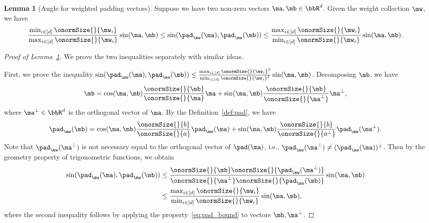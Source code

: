 \documentclass[lettersize,onecolumn,journal]{IEEEtran}
\theoremstyle{definition}
\newtheorem{lem}{Lemma}
\theoremstyle{definition}
\begin{document}
\begin{lem}[Angle for weighted padding vectors]\label{lem:pad} Suppose we have two non-zero vectors $\ma, \mb \in \bbR^d$. Given the weight collection $\mw$, we have 
\begin{equation}
   \frac{\min_{i \in [d]} \onormSize{}{\mw_i}}{\max_{i \in [d]} \onormSize{}{\mw_i} } \sin (\ma, \mb) \leq \sin(\pad_{\mw}(\ma),  \pad_{\mw}(\mb)) \leq \frac{ \max_{i \in [d]} \onormSize{}{\mw_i} }{\min_{i \in [d]} \onormSize{}{\mw_i}} \sin (\ma, \mb).
\end{equation}
\end{lem}

\begin{proof}[Proof of Lemma~\ref{lem:pad}] We prove the two inequalities separately with similar ideas.

First, we prove the inequality $\sin(\pad_{\mw}(\ma),  \pad_{\mw}(\mb)) \leq \frac{ \max_{i \in [d]} \onormSize{}{\mw_i}^2 }{\min_{i \in [d]} \onormSize{}{\mw_i}^2} \sin (\ma, \mb)$. Decomposing $\mb$, we have
\begin{equation}
    \mb = \cos (\ma, \mb) \frac{\onormSize{}{\mb}}{\onormSize{}{\ma}} \ma + \sin (\ma, \mb) \frac{\onormSize{}{\mb}}{\onormSize{}{\ma^{\perp}}}\ma^{\perp},
\end{equation}
where $\ma^{\perp} \in \bbR^d$ is the orthogonal vector of $\ma$. By the Definition~\ref{def:pad}, we have 
\begin{equation}\label{eq:pad_second_ineq}
    \pad_{\mw}(\mb) = \cos (\ma, \mb) \frac{\onormSize{}{b}}{\onormSize{}{a}} \pad_{\mw}(\ma) + \sin (\ma, \mb) \frac{\onormSize{}{b}}{\onormSize{}{a^{\perp}}} \pad_{\mw}(\ma^{\perp}).
\end{equation}
Note that $\pad_{\mw}(\ma^{\perp})$ is not necessary equal to the orthogonal vector of $\pad(\ma)$, i.e., $\pad_{\mw}(\ma^{\perp}) \neq (\pad_{\mw}(\ma))^{\perp}$. Then by the geometry property of trigonometric functions, we obtain
\begin{align}
    \sin(\pad_{\mw}(\ma),  \pad_{\mw}(\mb))  &\leq \frac{  \onormSize{}{\mb} \onormSize{}{\pad_{\mw}(\ma^{\perp})} }{ \onormSize{}{\ma^{\perp}} \onormSize{}{ \pad_{\mw}(\mb)}} \sin (\ma, \mb)  \\
    & \leq  \frac{ \max_{i \in [d]} \onormSize{}{\mw_i} }{\min_{i \in [d]} \onormSize{}{\mw_i}} \sin (\ma, \mb),
\end{align}
where the second inequality follows by applying the property~\eqref{eq:pad_bound} to vectors $\mb, \ma^{\perp}$. 


\end{proof}
\end{document}

